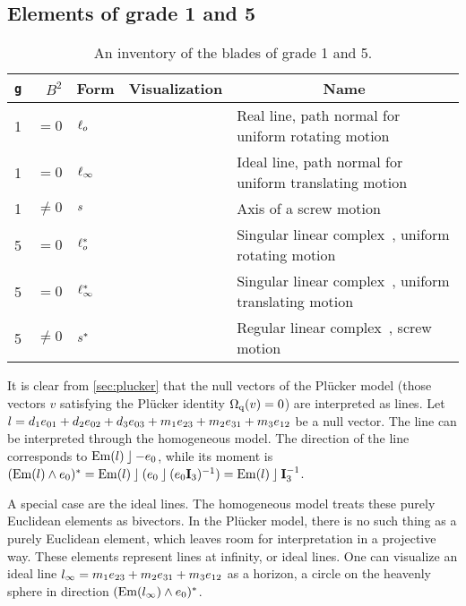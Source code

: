 \subsection{Elements of grade 1 and 5}
\begin{table}
  \caption{An inventory of the blades of grade 1 and 5.  
    }
  \label{tab:inv1}
  \begin{center}
    \begin{tabular}{|c|r|p{2.7cm}|p{2cm}|p{5cm}|}
      \hline
      \multicolumn{1}{|c|}{\texttt{g}} & $B^2$ & \multicolumn{1}{|c|}{Form} & \multicolumn{1}{|c|}{Visualization} & \multicolumn{1}{|c|}{Name} \\ \hline
      \hline
      1 & $= 0$ & $\ell_o$ & & Real line, path normal for uniform rotating motion~\cite{Pottmann}\\ \hline
      1 & $= 0$ & $\ell_\infty$ & & Ideal line, path normal for uniform translating motion~\cite{Pottmann}\\ \hline
      1 & $\not= 0$ & $s$ & & Axis of a screw motion~\cite{Pottmann}\\ \hline
      5 & $= 0$ & $\ell_o^\ast$ & & Singular linear complex~\cite{Pottmann}, uniform rotating motion \\ \hline
      5 & $= 0$ & $\ell_\infty^\ast$ & & Singular linear complex~\cite{Pottmann}, uniform translating motion \\ \hline
      5 & $\not= 0$ & $s^\ast$ & & Regular linear complex~\cite{Pottmann}, screw motion \\ \hline
    \end{tabular}
  \end{center}
\end{table}

It is clear from \autoref{sec:plucker} that the null vectors of the Pl\"ucker model (those vectors $v$ satisfying the Pl\"ucker identity $\operatorname{\Omega_q}(v) = 0$) are interpreted as lines.  Let $l = d_1 e_{01} + d_2 e_{02} + d_3 e_{03} + m_1 e_{23} + m_2 e_{31} + m_3 e_{12}$ be a null vector.  The line can be interpreted through the homogeneous model.  The direction of the line corresponds to $\operatorname{Em}(l) \mathbin{\rfloor} -e_0$, while its moment is $(\operatorname{Em}(l) \wedge e_0)^\ast = \operatorname{Em}(l) \mathbin{\rfloor} (e_0 \mathbin{\rfloor} (e_0\mathbf{I}_3)^{-1}) = \operatorname{Em}(l) \mathbin{\rfloor} \mathbf{I}_3^{-1}$.  

A special case are the ideal lines.  The homogeneous model treats these purely Euclidean elements as bivectors.  In the Pl\"ucker model, there is no such thing as a purely Euclidean element, which leaves room for interpretation in a projective way.  These elements represent lines at infinity, or ideal lines.  One can visualize an ideal line $l_\infty = m_1 e_{23} + m_2 e_{31} + m_3 e_{12}$ as a horizon, a circle on the heavenly sphere in direction $(\operatorname{Em}(l_\infty) \wedge e_0)^\ast$.  

